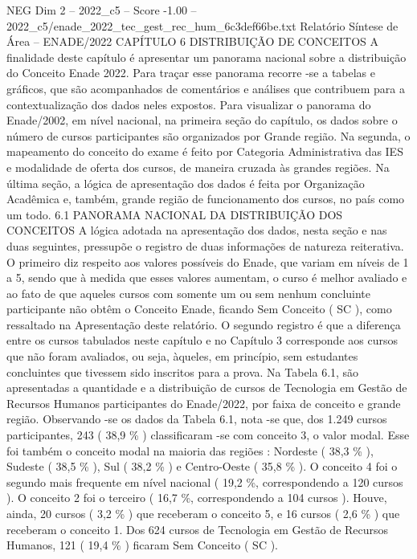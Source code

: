 \begin{textsample}{NEG Dim 2 – 2022\_c5 – Score -1.00 – 2022\_c5/enade\_2022\_tec\_gest\_rec\_hum\_6c3def66be.txt}  \label{ex:f2_neg_218}
Relatório Síntese de Área – ENADE/2022 CAPÍTULO 6 DISTRIBUIÇÃO DE CONCEITOS A finalidade deste capítulo é apresentar um panorama nacional sobre a distribuição do Conceito Enade 2022.
Para traçar esse panorama recorre -se a tabelas e gráficos, que são acompanhados de comentários e análises que contribuem para a contextualização dos dados neles expostos.
Para visualizar o panorama do Enade/2002, em nível nacional, na primeira seção do capítulo, os dados sobre o número de cursos participantes são organizados por Grande região.
Na segunda, o mapeamento do conceito do exame é feito por Categoria Administrativa das IES e modalidade de oferta dos cursos, de maneira cruzada às grandes regiões.
Na última seção, a lógica de apresentação dos dados é feita por Organização Acadêmica e, também, grande região de funcionamento dos cursos, no país como um todo. 6.1 PANORAMA NACIONAL DA DISTRIBUIÇÃO DOS CONCEITOS A lógica adotada na apresentação dos dados, nesta seção e nas duas seguintes, pressupõe o registro de duas informações de natureza reiterativa.
O primeiro diz respeito aos valores possíveis do Enade, que variam em níveis de 1 a 5, sendo que à medida que esses valores aumentam, o curso é melhor avaliado e ao fato de que aqueles cursos com somente um ou sem nenhum concluinte participante não obtêm o Conceito Enade, ficando Sem Conceito ( SC ), como ressaltado na Apresentação deste relatório.
O segundo registro é que a diferença entre os cursos tabulados neste capítulo e no Capítulo 3 corresponde aos cursos que não foram avaliados, ou seja, àqueles, em princípio, sem estudantes concluintes que tivessem sido inscritos para a prova.
Na Tabela 6.1, são apresentadas a quantidade e a distribuição de cursos de Tecnologia em Gestão de Recursos Humanos participantes do Enade/2022, por faixa de conceito e grande região.
Observando -se os dados da Tabela 6.1, nota -se que, dos 1.249 cursos participantes, 243 ( 38,9 \% ) classificaram -se com conceito 3, o valor modal.
Esse foi também o conceito modal na maioria das regiões : Nordeste ( 38,3 \% ), Sudeste ( 38,5 \% ), Sul ( 38,2 \% ) e Centro-Oeste ( 35,8 \% ).
O conceito 4 foi o segundo mais frequente em nível nacional ( 19,2 \%, correspondendo a 120 cursos ).
O conceito 2 foi o terceiro ( 16,7 \%, correspondendo a 104 cursos ).
Houve, ainda, 20 cursos ( 3,2 \% ) que receberam o conceito 5, e 16 cursos ( 2,6 \% ) que receberam o conceito 1.
Dos 624 cursos de Tecnologia em Gestão de Recursos Humanos, 121 ( 19,4 \% ) ficaram Sem Conceito ( SC ).

\end{textsample}
